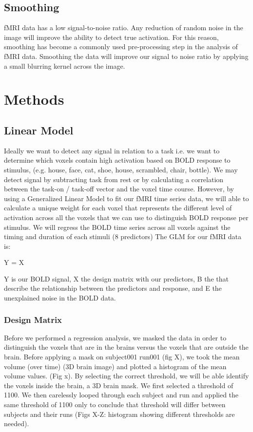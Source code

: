 \documentclass[12pt]{article}
\begin{document}
\subsection{Smoothing}

fMRI data has a low signal-to-noise ratio. Any reduction of random noise in the 
image will improve the ability to detect true activation.  For this reason, 
smoothing has become a commonly used pre-processing step in the analysis of fMRI 
data. Smoothing the data will improve our signal to noise ratio by applying a 
small blurring kernel across the image.

\section{Methods}

\subsection{Linear Model}
Ideally we want to detect any signal in relation to a task i.e. we want to 
determine which voxels contain high activation based on BOLD response to 
stimulus, (e.g. house, face, cat, shoe, house, scrambled, chair, bottle). We 
may detect signal by subtracting task from rest or by calculating a correlation 
between the task-on / task-off vector and the voxel time course. However, by 
using a Generalized Linear Model to fit our fMRI time series data, we will able 
to calculate a unique weight for each voxel that represents the different level 
of activation across all the voxels that we can use to distinguish BOLD 
response per stimulus.  We will regress the BOLD time series across all voxels 
against the timing and duration of each stimuli (8 predictors) The GLM for our 
fMRI data is:

Y = X\beta \pm \varepsilon 

Y is our BOLD signal, X the design matrix with our predictors, B the that 
describe the relationship between the predictors and response, and E the 
unexplained noise in the BOLD data.

\subsubsection{Design Matrix}
Before we performed a regression analysis, we masked the data in order to 
distinguish the voxels that are in the brains versus the voxels that are 
outside the brain. Before applying a mask on subject001 run001 (fig X), we took 
the mean volume (over time) (3D brain image) and plotted a histogram of the 
mean volume values. (Fig x). By selecting the correct threshold, we will be 
able identify the voxels inside the brain, a 3D brain mask. We first selected a 
threshold of 1100. We then carelessly looped through each subject and run and 
applied the same threshold of 1100 only to conclude that threshold will differ 
between subjects and their runs (Figs X-Z: histogram showing different 
thresholds are needed). 
\end{document}
